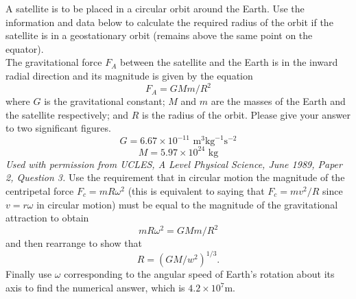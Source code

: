 
\begin{hint}[A1989PSIIQ3l] 
{A satellite is to be placed in a circular orbit around the Earth. Use the information and data below to calculate the required radius of the orbit if the satellite is in a geostationary orbit (remains above the same point on the equator). \\ The gravitational force $F_A$ between the satellite and the Earth is in the inward radial direction and its magnitude is given by the equation 
\begin{equation*}
F_A=GMm/R^2
\end{equation*}
where $G$ is the gravitational constant; $M$ and $m$ are the masses of the Earth and the satellite respectively; and $R$ is the radius of the orbit. Please give your answer to two significant figures.
}
{
\begin{equation*}
G=6.67\times 10^{-11} \textrm{ m}^3\textrm{kg}^{-1}\textrm{s}^{-2}
\end{equation*}
\begin{equation*}
M=5.97\times 10^{24} \textrm{ kg}
\end{equation*}
  }  
{\textit{Used with permission from UCLES, A Level Physical Science, June 1989, Paper 2, Question 3.}
}
{Use the requirement that in circular motion the magnitude of the centripetal force $F_c=mR\omega^2$ (this is equivalent to saying that $F_c=mv^2/R$ since $v=r\omega$ in circular motion) must be equal to the magnitude of the gravitational attraction to obtain \begin{equation*}
mR\omega^2=GMm/R^2
\end{equation*}
 and then rearrange to show that
 \begin{equation*}
{R={(GM/w^2)}^{1/3}.}
\end{equation*} 
Finally use $\omega$ corresponding to the angular speed of Earth's rotation about its axis to find the numerical answer, which is $4.2\times 10^7$m.}
\end{hint}
